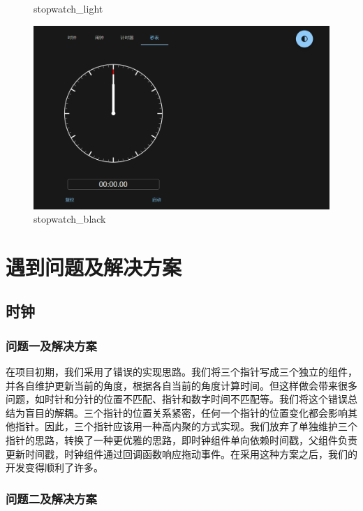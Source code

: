 \documentclass[a4paper,11pt]{article}
\begin{document}
\begin{figure}[!h]
\begin{minipage}{0.48\textwidth}
        \caption{stopwatch\_light}
    \end{minipage}
    \begin{minipage}{0.48\textwidth}
        \centering
        \includegraphics[width=\linewidth]{image/stopwatch_black.png}
        \caption{stopwatch\_black}
    \end{minipage}
\end{figure}
\clearpage
\section{遇到问题及解决方案}
\subsection{时钟}
\subsubsection{问题一及解决方案}

在项目初期，我们采用了错误的实现思路。我们将三个指针写成三个独立的组件，并各自维护更新当前的角度，根据各自当前的角度计算时间。但这样做会带来很多问题，如时针和分针的位置不匹配、指针和数字时间不匹配等。我们将这个错误总结为盲目的解耦。三个指针的位置关系紧密，任何一个指针的位置变化都会影响其他指针。因此，三个指针应该用一种高内聚的方式实现。我们放弃了单独维护三个指针的思路，转换了一种更优雅的思路，即时钟组件单向依赖时间戳，父组件负责更新时间戳，时钟组件通过回调函数响应拖动事件。在采用这种方案之后，我们的开发变得顺利了许多。

\subsubsection{问题二及解决方案}
\end{document}
